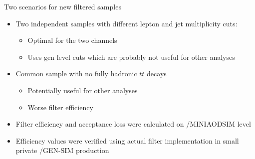 \documentclass[xcolor=table]{beamer}
\begin{document}
\begin{frame}{Two scenarios for new filtered samples}
\begin{itemize}
\item Two independent samples with different lepton and jet multiplicity cuts:
\begin{itemize}
\item Optimal for the two channels
\item Uses gen level cuts which are probably not useful for other analyses
\end{itemize}
\vspace{10pt}
\item Common sample with no fully hadronic $t\bar{t}$ decays
\begin{itemize}
\item Potentially useful for other analyses
\item Worse filter efficiency
\end{itemize}
\end{itemize}
\vspace{25pt}
\begin{itemize}
\item Filter efficiency and acceptance loss were calculated on /MINIAODSIM level
\item Efficiency values were verified using actual filter implementation in small private /GEN-SIM production 
\end{itemize}
\end{frame}
\end{document}
